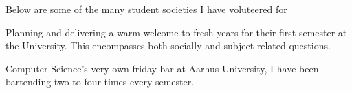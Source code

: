 Below are some of the many student societies I have voluteered for

\medskip

Planning and delivering a warm welcome to fresh years for their first semester
at the University. This encompasses both socially and subject related questions.

\divider

Computer Science's very own friday bar at Aarhus University, I have been
bartending two to four times every semester.
